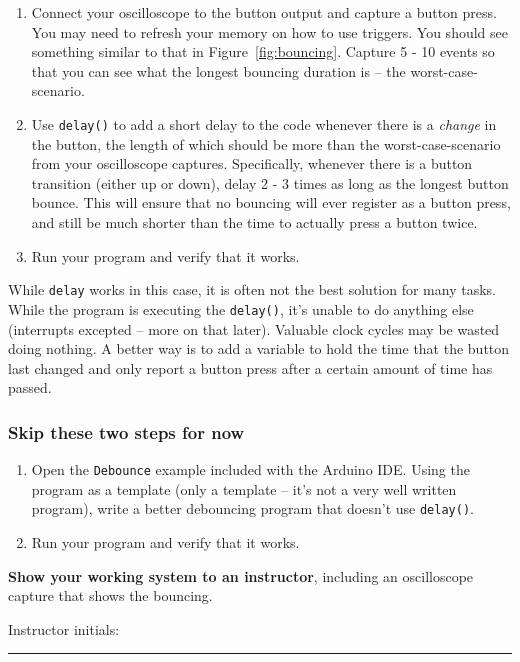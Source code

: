 \documentclass[11pt]{article} %
\begin{document}
\begin{enumerate}
\item Connect your oscilloscope to the button output and capture a button press. You may need to refresh your memory on how to use triggers. You should see something similar to that in Figure~\ref{fig:bouncing}. Capture 5 - 10 events so that you can see what the longest bouncing duration is -- the worst-case-scenario.
\item Use \verb|delay()| to add a short delay to the code whenever there is a \emph{change} in the button, the length of which should be more than the worst-case-scenario from your oscilloscope captures. Specifically, whenever there is a button transition (either up or down), delay 2 - 3 times as long as the longest button bounce. This will ensure that no bouncing will ever register as a button press, and still be much shorter than the time to actually press a button twice.
\item Run your program and verify that it works.
\end{enumerate}

While \verb|delay| works in this case, it is often not the best solution for many tasks. While the program is executing the \verb|delay()|, it’s unable to do anything else (interrupts excepted -- more on that later). Valuable clock cycles may be wasted doing nothing. A better way is to add a variable to hold the time that the button last changed and only report a button press after a certain amount of time has passed.

\subsubsection*{Skip these two steps for now}

\begin{enumerate}
\item Open the \verb|Debounce| example included with the Arduino IDE. Using the program as a template (only a template -- it’s not a very well written program), write a better debouncing program that doesn’t use \verb|delay()|.
\item Run your program and verify that it works.
\end{enumerate}

{\bf Show your working system to an instructor}, including an oscilloscope capture that shows the bouncing.

\vspace{0.25in}
Instructor initials: \rule{2in}{0.4pt}
\vspace{0.25in}
\end{document}
